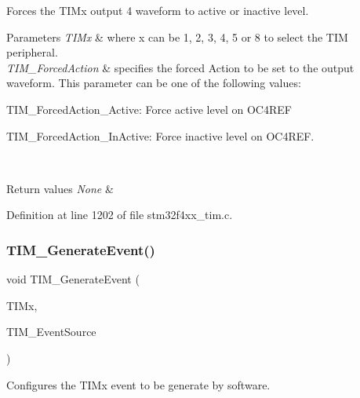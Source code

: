 Forces the T\+I\+Mx output 4 waveform to active or inactive level. 


\begin{DoxyParams}{Parameters}
{\em T\+I\+Mx} & where x can be 1, 2, 3, 4, 5 or 8 to select the T\+IM peripheral. \\
\hline
{\em T\+I\+M\+\_\+\+Forced\+Action} & specifies the forced Action to be set to the output waveform. This parameter can be one of the following values\+: \begin{DoxyItemize}
\item T\+I\+M\+\_\+\+Forced\+Action\+\_\+\+Active\+: Force active level on O\+C4\+R\+EF \item T\+I\+M\+\_\+\+Forced\+Action\+\_\+\+In\+Active\+: Force inactive level on O\+C4\+R\+EF. \end{DoxyItemize}
\\
\hline
\end{DoxyParams}

\begin{DoxyRetVals}{Return values}
{\em None} & \\
\hline
\end{DoxyRetVals}


Definition at line 1202 of file stm32f4xx\+\_\+tim.\+c.

\mbox{\label{group___t_i_m_ga38bd4ffda920dd4f7655a0a2c6100a6e}} 
\subsubsection{\texorpdfstring{T\+I\+M\+\_\+\+Generate\+Event()}{TIM\_GenerateEvent()}}
{\footnotesize\ttfamily void T\+I\+M\+\_\+\+Generate\+Event (\begin{DoxyParamCaption}\item[{\hyperlink{struct_t_i_m___type_def}{T\+I\+M\+\_\+\+Type\+Def} $\ast$}]{T\+I\+Mx,  }\item[{uint16\+\_\+t}]{T\+I\+M\+\_\+\+Event\+Source }\end{DoxyParamCaption})}



Configures the T\+I\+Mx event to be generate by software. 


